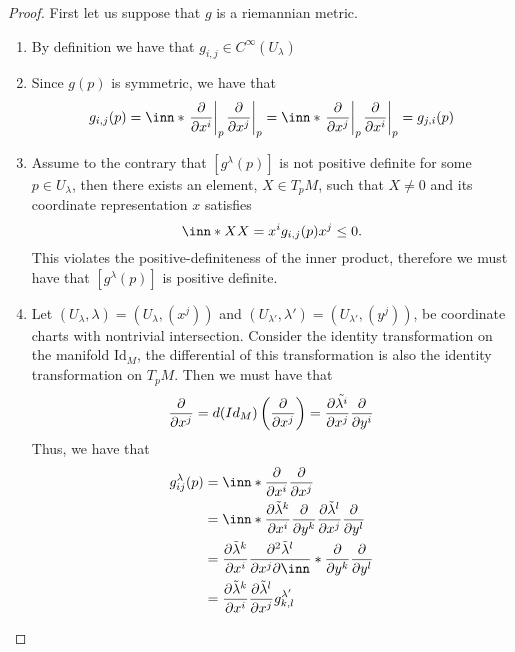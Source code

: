 \documentclass[a4paper]{article}
\begin{document}
\begin{proof}
  First let us suppose that $g$ is a riemannian metric. 
  \begin{enumerate}
    \item By definition we have that $g_{i,j} \in C^{\infty}(U_\lambda)$
    \item Since $g(p)$ is symmetric, we have that 
      \[
        g_{i,j}(p) = \inn*{\eval{\pdv{}{x^i}}_p}{\eval{\pdv{}{x^j}}_p} = \inn*{\eval{\pdv{}{x^j}}_p}{\eval{\pdv{}{x^i}}_p} = g_{j,i}(p)
      \]
    \item Assume to the contrary that $[g^\lambda(p)]$ is not positive definite for some $p \in U_\lambda$, then there exists an element, $X \in T_pM$, such that $X \neq 0$ and its coordinate representation $x$ satisfies
      \[
        \inn*{X}{X} = x^ig_{i,j}(p)x^j \leq 0.
      \]
      This violates the positive-definiteness of the inner product, therefore we must have that $[g^\lambda(p)]$ is positive definite.
    \item Let $(U_\lambda, \lambda) = (U_\lambda, (x^j))$ and $(U_{\lambda'}, \lambda') = (U_{\lambda'}, (y^j))$, be coordinate charts with nontrivial intersection. Consider the identity transformation on the manifold $\text{Id}_M$, the differential of this transformation is also the identity transformation on $T_pM$. Then we must have that
      \[
        \pdv{x^j} = d(Id_M) \left( \pdv{x^j} \right) = \pdv{\tilde{\lambda^i}}{x^j} \pdv{y^i}
      \]
      Thus, we have that
      \[
        \begin{aligned}
          g_{ij}^\lambda(p) &= \inn*{\pdv{x^i}}{\pdv{x^j}} \\
                            &= \inn*{\pdv{\tilde{\lambda}^k}{x^i}\pdv{y^k}}{\pdv{\tilde{\lambda}^l}{x^j}\pdv{y^l}} \\
                            &= \pdv{\tilde{\lambda}^k}{x^i}\pdv{\tilde{\lambda}^l}{x^j} \inn*{\pdv{y^k}}{\pdv{y^l}} \\
                            &=  \pdv{\tilde{\lambda}^k}{x^i}\pdv{\tilde{\lambda}^l}{x^j} g_{k,l}^{\lambda'}
        \end{aligned}
      \]
  \end{enumerate}


\end{proof}
\end{document}

